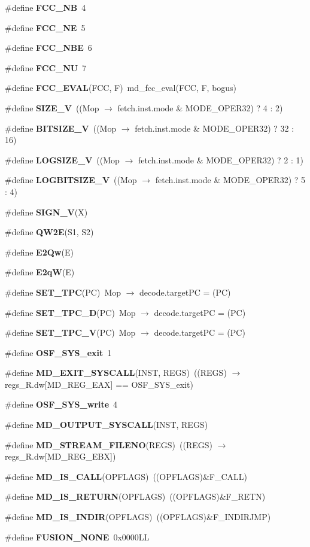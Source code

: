 \begin{CompactItemize}
\#define {\bf FCC\_\-NB}~4
\item 
\#define {\bf FCC\_\-NE}~5
\item 
\#define {\bf FCC\_\-NBE}~6
\item 
\#define {\bf FCC\_\-NU}~7
\item 
\#define {\bf FCC\_\-EVAL}(FCC, F)~md\_\-fcc\_\-eval(FCC, F, bogus)
\item 
\#define {\bf SIZE\_\-V}~((Mop $\rightarrow$ fetch.inst.mode \& MODE\_\-OPER32) ? 4 : 2)
\item 
\#define {\bf BITSIZE\_\-V}~((Mop $\rightarrow$ fetch.inst.mode \& MODE\_\-OPER32) ? 32 : 16)
\item 
\#define {\bf LOGSIZE\_\-V}~((Mop $\rightarrow$ fetch.inst.mode \& MODE\_\-OPER32) ? 2 : 1)
\item 
\#define {\bf LOGBITSIZE\_\-V}~((Mop $\rightarrow$ fetch.inst.mode \& MODE\_\-OPER32) ? 5 : 4)
\item 
\#define {\bf SIGN\_\-V}(X)
\item 
\#define {\bf QW2E}(S1, S2)
\item 
\#define {\bf E2Qw}(E)
\item 
\#define {\bf E2qW}(E)
\item 
\#define {\bf SET\_\-TPC}(PC)~Mop $\rightarrow$ decode.targetPC = (PC)
\item 
\#define {\bf SET\_\-TPC\_\-D}(PC)~Mop $\rightarrow$ decode.targetPC = (PC)
\item 
\#define {\bf SET\_\-TPC\_\-V}(PC)~Mop $\rightarrow$ decode.targetPC = (PC)
\item 
\#define {\bf OSF\_\-SYS\_\-exit}~1
\item 
\#define {\bf MD\_\-EXIT\_\-SYSCALL}(INST, REGS)~((REGS) $\rightarrow$ regs\_\-R.dw[MD\_\-REG\_\-EAX] == OSF\_\-SYS\_\-exit)
\item 
\#define {\bf OSF\_\-SYS\_\-write}~4
\item 
\#define {\bf MD\_\-OUTPUT\_\-SYSCALL}(INST, REGS)
\item 
\#define {\bf MD\_\-STREAM\_\-FILENO}(REGS)~((REGS) $\rightarrow$ regs\_\-R.dw[MD\_\-REG\_\-EBX])
\item 
\#define {\bf MD\_\-IS\_\-CALL}(OPFLAGS)~((OPFLAGS)\&F\_\-CALL)
\item 
\#define {\bf MD\_\-IS\_\-RETURN}(OPFLAGS)~((OPFLAGS)\&F\_\-RETN)
\item 
\#define {\bf MD\_\-IS\_\-INDIR}(OPFLAGS)~((OPFLAGS)\&F\_\-INDIRJMP)
\item 
\#define {\bf FUSION\_\-NONE}~0x0000LL
\item 

\end{CompactItemize}
